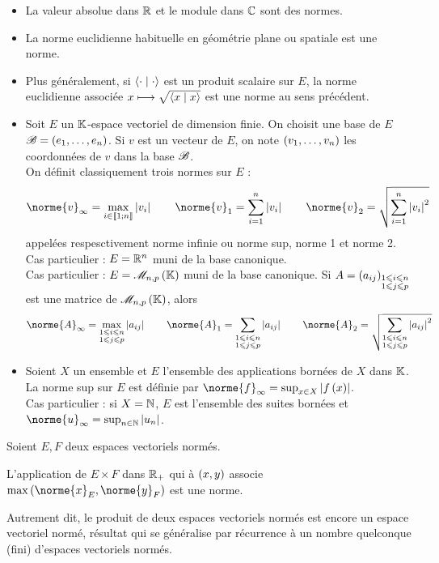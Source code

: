 \begin{itemize}
    \item La valeur absolue dans \(\mathbb{R}\) et le module dans \(\mathbb{C}\) sont des normes. \\
    \item La norme euclidienne habituelle en géométrie plane ou spatiale est une norme. \\
    \item Plus généralement, si \(\left\langle\cdot\;\middle|\;\cdot\right\rangle\) est un produit scalaire sur \(E\), la norme euclidienne associée \(x\longmapsto\sqrt{\left\langle x\;\middle|\; x\right\rangle}\) est une norme au sens précédent. \\
    \item Soit \(E\) un \(\mathbb{K}\)-espace vectoriel de dimension finie. On choisit une base de \(E\) \(\mathscr{B}=\left(e_1,\dots,e_n\right)\). Si \(v\) est un vecteur de \(E\), on note \(\left(v_1,\dots,v_n\right)\) les coordonnées de \(v\) dans la base \(\mathscr{B}\). \\ On définit classiquement trois normes sur \(E\) : \[\norme{v}_\infty=\max_{i\in\interventierii{1}{n}}\abs{v_i}\qquad\norme{v}_1=\sum_{i=1}^n\abs{v_i}\qquad\norme{v}_2=\sqrt{\sum_{i=1}^n\abs{v_i}^2}\] appelées respesctivement norme infinie ou norme sup, norme 1 et norme 2. \\ Cas particulier : \(E=\mathbb{R}^n\) muni de la base canonique. \\ Cas particulier : \(E=\M{n,p}\) muni de la base canonique. Si \(A=\left(a_{ij}\right)_{\substack{1\leqslant i\leqslant n \\ 1\leqslant j\leqslant p}}\) est une matrice de \(\M{n,p}\), alors \[\norme{A}_\infty=\max_{\substack{1\leq i\leq n \\ 1\leq j\leq p}}\abs{a_{ij}}\qquad\norme{A}_1=\sum_{\substack{1\leq i\leq n \\ 1\leq j\leq p}}\abs{a_{ij}}\qquad\norme{A}_2=\sqrt{\sum_{\substack{1\leq i\leq n \\ 1\leq j\leq p}}\abs{a_{ij}}^2}\]
    \item Soient \(X\) un ensemble et \(E\) l'ensemble des applications bornées de \(X\) dans \(\mathbb{K}\). La norme sup sur \(E\) est définie par \(\norme{f}_\infty=\sup_{x\in X}\abs{f\paren{x}}\). \\ Cas particulier : si \(X=\mathbb{N}\), \(E\) est l'ensemble des suites bornées et \(\norme{u}_\infty=\sup_{n\in\N}\abs{u_n}\).
\end{itemize}

\begin{prop}
Soient \(E,F\) deux espaces vectoriels normés.

L'application de \(E\times F\) dans \(\mathbb{R}_+\) qui à \(\left(x,y\right)\) associe \(\max\paren{\norme{x}_E,\norme{y}_F}\) est une norme.

Autrement dit, le produit de deux espaces vectoriels normés est encore un espace vectoriel normé, résultat qui se généralise par récurrence à un nombre quelconque (fini) d'espaces vectoriels normés.
\end{prop}

